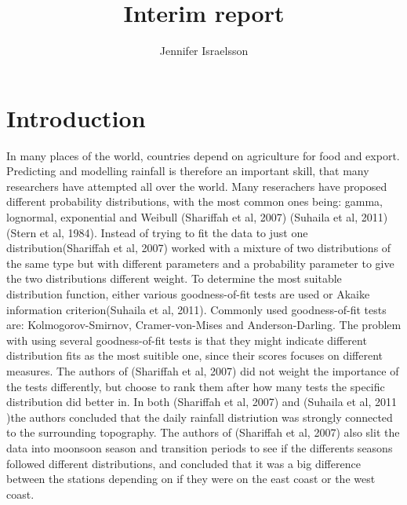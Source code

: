 \documentclass{article}
\author{Jennifer Israelsson}
\begin{document}
	\title{Interim report}
	\maketitle
	
	\section{Introduction}
	In many places of the world, countries depend on agriculture for food and export. Predicting and modelling rainfall is therefore an important skill, that many researchers have attempted all over the world. Many reserachers have proposed different probability distributions, with the most common ones being: gamma, lognormal, exponential and Weibull (Shariffah et al, 2007) (Suhaila et al, 2011) (Stern et al, 1984). Instead of trying to fit the data to just one distribution(Shariffah et al, 2007) worked with a mixture of two distributions of the same type but with different parameters and a probability parameter to give the two distributions different weight. To determine the most suitable distribution function, either various goodness-of-fit tests are used or Akaike information criterion(Suhaila et al, 2011). Commonly used goodness-of-fit tests are: Kolmogorov-Smirnov, Cramer-von-Mises and Anderson-Darling. The problem with using several goodness-of-fit tests is that they might indicate different distribution fits as the most suitible one, since their scores focuses on different measures. The authors of (Shariffah et al, 2007) did not weight the importance of the tests differently, but choose to rank them after how many tests the specific distribution did better in. In both (Shariffah et al, 2007) and (Suhaila et al, 2011 )the authors concluded that the daily rainfall distriution was strongly connected to the surrounding topography. The authors of (Shariffah et al, 2007) also slit the data into moonsoon season and transition periods to see if the differents seasons followed different distributions, and concluded that it was a big difference between the stations depending on if they were on the east coast or the west coast. \\
\end{document}
